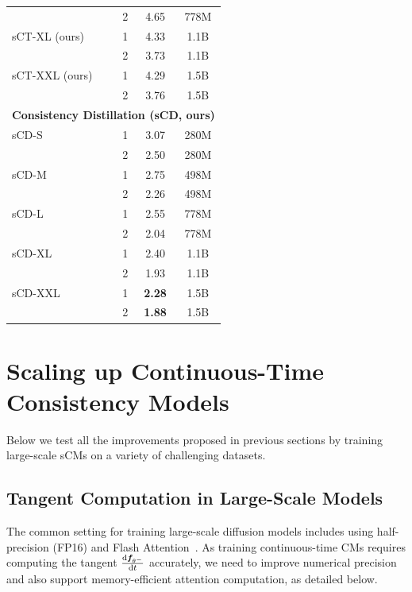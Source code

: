 \begin{table}[t]
\begin{minipage}{0.48\textwidth}
{\begin{tabular}{lccc}
& 2 & 4.65 & 778M \\ 
sCT-XL (ours) & 1 & 4.33 & 1.1B \\
& 2 & 3.73 & 1.1B \\ 
sCT-XXL (ours) & 1 & 4.29 & 1.5B \\
& 2 & 3.76 & 1.5B \\
\midrule
\multicolumn{4}{l}{\textbf{Consistency Distillation (sCD, ours)}} \\
\midrule
sCD-S & 1 & 3.07 & 280M \\
& 2 & 2.50 & 280M \\ 
sCD-M & 1 & 2.75 & 498M \\
& 2 & 2.26 & 498M \\ 
sCD-L & 1 & 2.55 & 778M \\
& 2 & 2.04 & 778M \\ 
sCD-XL & 1 & 2.40 & 1.1B \\
& 2 & 1.93 & 1.1B \\ 
sCD-XXL & 1 & \textbf{2.28} & 1.5B \\ 
& 2 & \textbf{1.88} & 1.5B \\
\bottomrule
\end{tabular} %
}

\end{minipage}
\end{table}










\section{Scaling up Continuous-Time Consistency Models}
Below we test all the improvements proposed in previous sections by training large-scale sCMs on a variety of challenging datasets.


\subsection{Tangent Computation in Large-Scale Models}
\label{sec:jvp_large_scale}
The common setting for training large-scale diffusion models includes using half-precision (FP16) and Flash Attention~\citep{dao2022flashattention,dao2023flashattention2}. As training continuous-time CMs requires computing the tangent $\frac{\mathrm{d} {\bm{f}}_{\theta^-}}{\mathrm{d} t}$ accurately, we need to improve numerical precision and also support memory-efficient attention computation, as detailed below.

